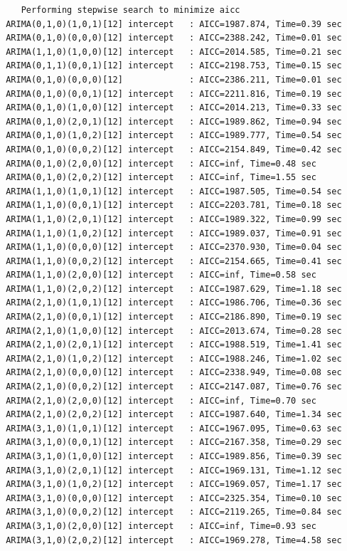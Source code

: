\documentclass[a4paper, 12pt]{article}
\begin{document}
\begin{verbatim}
    Performing stepwise search to minimize aicc
 ARIMA(0,1,0)(1,0,1)[12] intercept   : AICC=1987.874, Time=0.39 sec
 ARIMA(0,1,0)(0,0,0)[12] intercept   : AICC=2388.242, Time=0.01 sec
 ARIMA(1,1,0)(1,0,0)[12] intercept   : AICC=2014.585, Time=0.21 sec
 ARIMA(0,1,1)(0,0,1)[12] intercept   : AICC=2198.753, Time=0.15 sec
 ARIMA(0,1,0)(0,0,0)[12]             : AICC=2386.211, Time=0.01 sec
 ARIMA(0,1,0)(0,0,1)[12] intercept   : AICC=2211.816, Time=0.19 sec
 ARIMA(0,1,0)(1,0,0)[12] intercept   : AICC=2014.213, Time=0.33 sec
 ARIMA(0,1,0)(2,0,1)[12] intercept   : AICC=1989.862, Time=0.94 sec
 ARIMA(0,1,0)(1,0,2)[12] intercept   : AICC=1989.777, Time=0.54 sec
 ARIMA(0,1,0)(0,0,2)[12] intercept   : AICC=2154.849, Time=0.42 sec
 ARIMA(0,1,0)(2,0,0)[12] intercept   : AICC=inf, Time=0.48 sec
 ARIMA(0,1,0)(2,0,2)[12] intercept   : AICC=inf, Time=1.55 sec
 ARIMA(1,1,0)(1,0,1)[12] intercept   : AICC=1987.505, Time=0.54 sec
 ARIMA(1,1,0)(0,0,1)[12] intercept   : AICC=2203.781, Time=0.18 sec
 ARIMA(1,1,0)(2,0,1)[12] intercept   : AICC=1989.322, Time=0.99 sec
 ARIMA(1,1,0)(1,0,2)[12] intercept   : AICC=1989.037, Time=0.91 sec
 ARIMA(1,1,0)(0,0,0)[12] intercept   : AICC=2370.930, Time=0.04 sec
 ARIMA(1,1,0)(0,0,2)[12] intercept   : AICC=2154.665, Time=0.41 sec
 ARIMA(1,1,0)(2,0,0)[12] intercept   : AICC=inf, Time=0.58 sec
 ARIMA(1,1,0)(2,0,2)[12] intercept   : AICC=1987.629, Time=1.18 sec
 ARIMA(2,1,0)(1,0,1)[12] intercept   : AICC=1986.706, Time=0.36 sec
 ARIMA(2,1,0)(0,0,1)[12] intercept   : AICC=2186.890, Time=0.19 sec
 ARIMA(2,1,0)(1,0,0)[12] intercept   : AICC=2013.674, Time=0.28 sec
 ARIMA(2,1,0)(2,0,1)[12] intercept   : AICC=1988.519, Time=1.41 sec
 ARIMA(2,1,0)(1,0,2)[12] intercept   : AICC=1988.246, Time=1.02 sec
 ARIMA(2,1,0)(0,0,0)[12] intercept   : AICC=2338.949, Time=0.08 sec
 ARIMA(2,1,0)(0,0,2)[12] intercept   : AICC=2147.087, Time=0.76 sec
 ARIMA(2,1,0)(2,0,0)[12] intercept   : AICC=inf, Time=0.70 sec
 ARIMA(2,1,0)(2,0,2)[12] intercept   : AICC=1987.640, Time=1.34 sec
 ARIMA(3,1,0)(1,0,1)[12] intercept   : AICC=1967.095, Time=0.63 sec
 ARIMA(3,1,0)(0,0,1)[12] intercept   : AICC=2167.358, Time=0.29 sec
 ARIMA(3,1,0)(1,0,0)[12] intercept   : AICC=1989.856, Time=0.39 sec
 ARIMA(3,1,0)(2,0,1)[12] intercept   : AICC=1969.131, Time=1.12 sec
 ARIMA(3,1,0)(1,0,2)[12] intercept   : AICC=1969.057, Time=1.17 sec
 ARIMA(3,1,0)(0,0,0)[12] intercept   : AICC=2325.354, Time=0.10 sec
 ARIMA(3,1,0)(0,0,2)[12] intercept   : AICC=2119.265, Time=0.84 sec
 ARIMA(3,1,0)(2,0,0)[12] intercept   : AICC=inf, Time=0.93 sec
 ARIMA(3,1,0)(2,0,2)[12] intercept   : AICC=1969.278, Time=4.58 sec

\end{verbatim}
\end{document}
